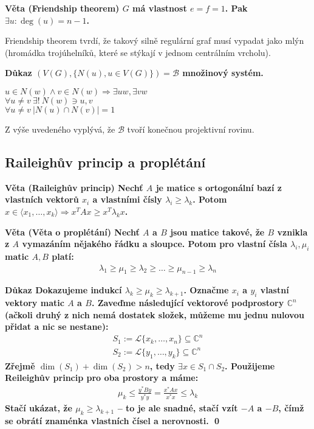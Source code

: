 \documentclass[a4paper,12pt,titlepage]{article}
\newcommand{\dk}{\smallskip\noindent\bf Důkaz\rm{} }
\newcommand{\vt}{\smallskip\noindent\bf Věta\rm{} }
\newcommand{\B}{\mathcal{B}}
\renewcommand{\L}{\mathcal{L}}
\newcommand{\C}{\mathbb{C}}
\renewcommand{\L}{\mathcal{L}}
\begin{document}
\vt (Friendship theorem) $G$ má vlastnost $e = f = 1$. Pak $\exists u: \deg(u) = n-1$.

Friendship theorem tvrdí, že takový silně regulární graf musí vypadat jako
mlýn (hromádka trojúhelníků, které se stýkají v jednom centrálním vrcholu).

\dk $(V(G), \{N(u), u\in V(G)\}) = \B$ množinový systém.

$u \in N(w) \wedge v \in N(w) \Rightarrow \exists uw, \exists vw$ \\
\indent $\forall u\neq v\ \exists!\ N(w) \ni u,v$ \\
\indent $\forall u\neq v\ |N(u)\cap N(v)| = 1$

Z výše uvedeného vyplývá, že $\B$ tvoří konečnou projektivní rovinu.

\subsection{Raileighův princip a proplétání}
\vt (Raileighův princip) Nechť $A$ je matice s ortogonální bazí z vlastních 
vektorů $x_i$ a vlastními čísly $\lambda_i \geq \lambda_k$. Potom $x \in\langle 
x_1,\dots,x_k\rangle \Rightarrow x^TAx\geq x^T\lambda_kx$.

\vt (Věta o proplétání) Nechť $A$ a $B$ jsou matice takové, že $B$ vznikla z $A$ 
vymazáním nějakého řádku a sloupce. Potom pro vlastní čísla $\lambda_i,\mu_i$ 
matic $A,B$ platí:
\begin{align}
	\lambda_1 \geq \mu_1 \geq \lambda_2 \geq \dots\geq \mu_{n-1} \geq \lambda_n
\end{align}

\dk Dokazujeme indukcí $\lambda_k \geq \mu_k \geq \lambda_{k+1}$. Označme $x_i$ 
a $y_i$ vlastní vektory matic $A$ a $B$.  Zaveďme následující vektorové 
podprostory $\C^n$ (ačkoli druhý z nich nemá dostatek složek, můžeme mu jednu 
nulovou přidat a nic se nestane):
\begin{align}
S_1 := \L\{x_k, \dots, x_n\} \subseteq \C^n \\
S_2 := \L\{y_1, \dots, y_k\} \subseteq \C^n
\end{align}
Zřejmě $\dim(S_1) + \dim(S_2) > n$, tedy $\exists x \in S_1\cap S_2$. Použijeme 
Reileighův princip pro oba prostory a máme:
\begin{align}
	\mu_k \leq \frac{y^*By}{y^*y} = \frac{x^*Ax}{x^*x} \leq \lambda_k
\end{align}
Stačí ukázat, že $\mu_k \geq \lambda_{k+1}$ -- to je ale snadné, stačí vzít $-A$ 
a $-B$, čímž se obrátí znaménka vlastních čísel a nerovnosti. \qed
\end{document}
